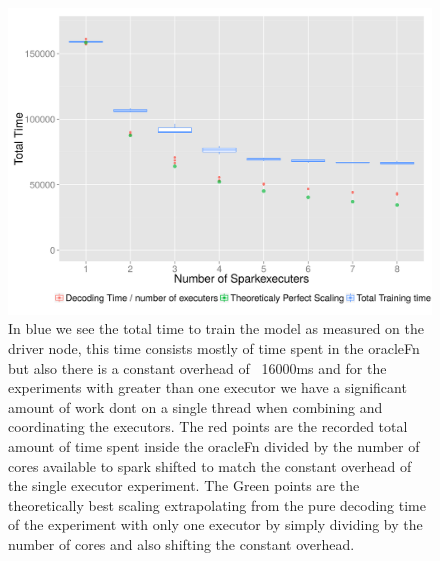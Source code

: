 \begin{figure}
  \centering
  \includegraphics[width=1.0\textwidth]{images/singleMachineScalability.png}
  \caption{ In blue we see the total time to train the model as measured on the driver node, this time consists mostly of time spent in the oracleFn but also there is a constant overhead of ~16000ms and for the experiments with greater than one executor we have a significant amount of work dont on a single thread when combining and coordinating the executors. The red points are the recorded total amount of time spent inside the oracleFn divided by the number of cores available to spark shifted to match the constant overhead of the single executor experiment. The Green points are the theoretically best scaling extrapolating from the pure decoding time of the experiment with only one executor by simply dividing by the number of cores and also shifting the constant overhead.  } 
  \label{fig:singelNodeScale}
\end{figure}
\par 

